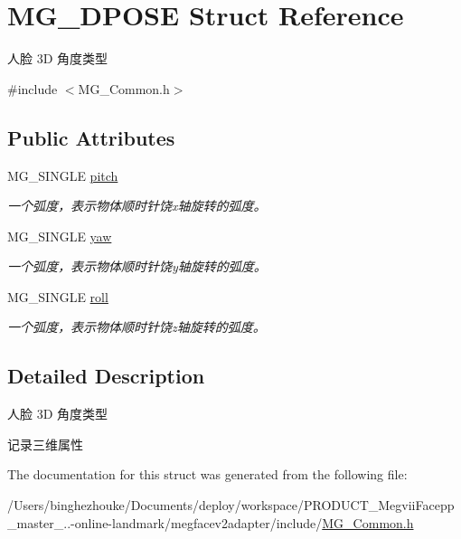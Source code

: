 \hypertarget{struct_m_g__3_d_p_o_s_e}{}\section{M\+G\+\_\+D\+P\+O\+SE Struct Reference}
\label{struct_m_g__3_d_p_o_s_e}


人脸 3D 角度类型  




{\ttfamily \#include $<$M\+G\+\_\+\+Common.\+h$>$}

\subsection*{Public Attributes}
\begin{DoxyCompactItemize}
\item 
\mbox{\label{struct_m_g__3_d_p_o_s_e_ae12f8b9ce7819c6946ab12c01792e7e6}} 
M\+G\+\_\+\+S\+I\+N\+G\+LE \hyperlink{struct_m_g__3_d_p_o_s_e_ae12f8b9ce7819c6946ab12c01792e7e6}{pitch}
\begin{DoxyCompactList}\small\item\em 一个弧度，表示物体顺时针饶x轴旋转的弧度。 \end{DoxyCompactList}\item 
\mbox{\label{struct_m_g__3_d_p_o_s_e_aba9edfa27bb55850594e0f030dee17f7}} 
M\+G\+\_\+\+S\+I\+N\+G\+LE \hyperlink{struct_m_g__3_d_p_o_s_e_aba9edfa27bb55850594e0f030dee17f7}{yaw}
\begin{DoxyCompactList}\small\item\em 一个弧度，表示物体顺时针饶y轴旋转的弧度。 \end{DoxyCompactList}\item 
\mbox{\label{struct_m_g__3_d_p_o_s_e_ac2025acd9c519bc466e9d5bec7a7782a}} 
M\+G\+\_\+\+S\+I\+N\+G\+LE \hyperlink{struct_m_g__3_d_p_o_s_e_ac2025acd9c519bc466e9d5bec7a7782a}{roll}
\begin{DoxyCompactList}\small\item\em 一个弧度，表示物体顺时针饶z轴旋转的弧度。 \end{DoxyCompactList}\end{DoxyCompactItemize}


\subsection{Detailed Description}
人脸 3D 角度类型 

记录三维属性 

The documentation for this struct was generated from the following file\+:\begin{DoxyCompactItemize}
\item 
/\+Users/binghezhouke/\+Documents/deploy/workspace/\+P\+R\+O\+D\+U\+C\+T\+\_\+\+Megvii\+Facepp\+\_\+master\+\_..-\/online-\/landmark/megfacev2adapter/include/\hyperlink{_m_g___common_8h}{M\+G\+\_\+\+Common.\+h}\end{DoxyCompactItemize}

